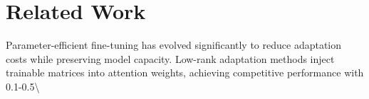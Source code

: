 \documentclass[11pt,a4paper]{article}
\begin{document}
\section{Related Work}
Parameter-efficient fine-tuning has evolved significantly to reduce adaptation costs while preserving model capacity. Low-rank adaptation methods inject trainable matrices into attention weights, achieving competitive performance with 0.1-0.5\textbackslash{}%
\end{document}

